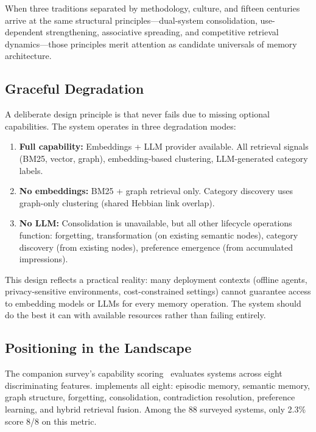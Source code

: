 \medskip
\noindent When three traditions separated by methodology, culture, and
fifteen centuries arrive at the same structural principles---dual-system
consolidation, use-dependent strengthening, associative spreading, and
competitive retrieval dynamics---those principles merit attention as
candidate universals of memory architecture.

\subsection{Graceful Degradation}

A deliberate design principle is that \alaya{} never fails due to missing
optional capabilities. The system operates in three degradation modes:

\begin{enumerate}[nosep]
    \item \textbf{Full capability:} Embeddings + LLM provider available.
    All retrieval signals (BM25, vector, graph), embedding-based clustering,
    LLM-generated category labels.
    \item \textbf{No embeddings:} BM25 + graph retrieval only. Category
    discovery uses graph-only clustering (shared Hebbian link overlap).
    \item \textbf{No LLM:} Consolidation is unavailable, but all other
    lifecycle operations function: forgetting, transformation (on existing
    semantic nodes), category discovery (from existing nodes), preference
    emergence (from accumulated impressions).
\end{enumerate}

This design reflects a practical reality: many deployment contexts
(offline agents, privacy-sensitive environments, cost-constrained settings)
cannot guarantee access to embedding models or LLMs for every memory
operation. The system should do the best it can with available resources
rather than failing entirely.

\subsection{Positioning in the Landscape}

The companion survey's capability scoring~\cite{hui2026taxonomy} evaluates
systems across eight discriminating features. \alaya{} implements all eight:
episodic memory, semantic memory, graph structure, forgetting,
consolidation, contradiction resolution, preference learning, and hybrid
retrieval fusion. Among the 88 surveyed systems, only 2.3\% score 8/8 on
this metric.

